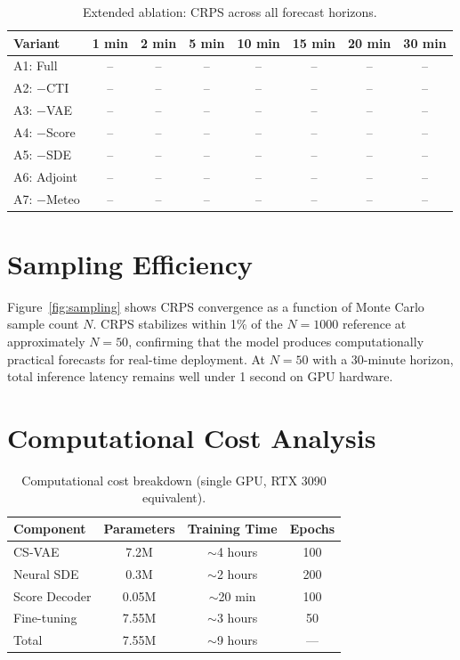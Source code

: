 \documentclass{article}
\begin{document}
\begin{table}[h]
\centering
\caption{Extended ablation: CRPS across all forecast horizons.}
\label{tab:ablation_full}
\begin{tabular}{lccccccc}
\toprule
Variant & 1 min & 2 min & 5 min & 10 min & 15 min & 20 min & 30 min \\
\midrule
A1: Full & -- & -- & -- & -- & -- & -- & -- \\
A2: $-$CTI & -- & -- & -- & -- & -- & -- & -- \\
A3: $-$VAE & -- & -- & -- & -- & -- & -- & -- \\
A4: $-$Score & -- & -- & -- & -- & -- & -- & -- \\
A5: $-$SDE & -- & -- & -- & -- & -- & -- & -- \\
A6: Adjoint & -- & -- & -- & -- & -- & -- & -- \\
A7: $-$Meteo & -- & -- & -- & -- & -- & -- & -- \\
\bottomrule
\end{tabular}
\end{table}

\section{Sampling Efficiency}
\label{app:sampling}

Figure~\ref{fig:sampling} shows CRPS convergence as a function of Monte Carlo sample count $N$. CRPS stabilizes within 1\% of the $N=1000$ reference at approximately $N=50$, confirming that the model produces computationally practical forecasts for real-time deployment. At $N=50$ with a 30-minute horizon, total inference latency remains well under 1 second on GPU hardware.

\section{Computational Cost Analysis}
\label{app:compute}

\begin{table}[h]
\centering
\caption{Computational cost breakdown (single GPU, RTX 3090 equivalent).}
\begin{tabular}{lccc}
\toprule
Component & Parameters & Training Time & Epochs \\
\midrule
CS-VAE & 7.2M & $\sim$4 hours & 100 \\
Neural SDE & 0.3M & $\sim$2 hours & 200 \\
Score Decoder & 0.05M & $\sim$20 min & 100 \\
Fine-tuning & 7.55M & $\sim$3 hours & 50 \\
\midrule
Total & 7.55M & $\sim$9 hours & --- \\
\bottomrule
\end{tabular}
\end{table}
\end{document}
